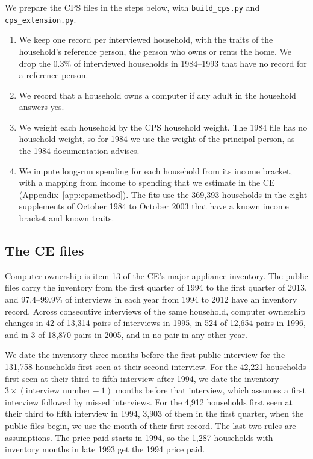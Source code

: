 \documentclass[11pt]{article}
\begin{document}
We prepare the CPS files in the steps below, with \texttt{build\_cps.py} and \texttt{cps\_extension.py}.
\begin{enumerate}\setlength{\itemsep}{1pt}
\item We keep one record per interviewed household, with the traits of the household's reference person, the person who owns or rents the home. We drop the 0.3\% of interviewed households in 1984--1993 that have no record for a reference person.
\item We record that a household owns a computer if any adult in the household answers yes.
\item We weight each household by the CPS household weight. The 1984 file has no household weight, so for 1984 we use the weight of the principal person, as the 1984 documentation advises.
\item We impute long-run spending for each household from its income bracket, with a mapping from income to spending that we estimate in the CE (Appendix~\ref{app:cpsmethod}). The fits use the 369{,}393 households in the eight supplements of October 1984 to October 2003 that have a known income bracket and known traits.
\end{enumerate}

\subsection{The CE files}
\label{app:cefiles}

Computer ownership is item 13 of the CE's major-appliance inventory. The public files carry the inventory from the first quarter of 1994 to the first quarter of 2013, and 97.4--99.9\% of interviews in each year from 1994 to 2012 have an inventory record. Across consecutive interviews of the same household, computer ownership changes in 42 of 13{,}314 pairs of interviews in 1995, in 524 of 12{,}654 pairs in 1996, and in 3 of 18{,}870 pairs in 2005, and in no pair in any other year.

We date the inventory three months before the first public interview for the 131{,}758 households first seen at their second interview. For the 42{,}221 households first seen at their third to fifth interview after 1994, we date the inventory $3 \times (\text{interview number} - 1)$ months before that interview, which assumes a first interview followed by missed interviews. For the 4{,}912 households first seen at their third to fifth interview in 1994, 3{,}903 of them in the first quarter, when the public files begin, we use the month of their first record. The last two rules are assumptions. The price paid starts in 1994, so the 1{,}287 households with inventory months in late 1993 get the 1994 price paid.
\end{document}
